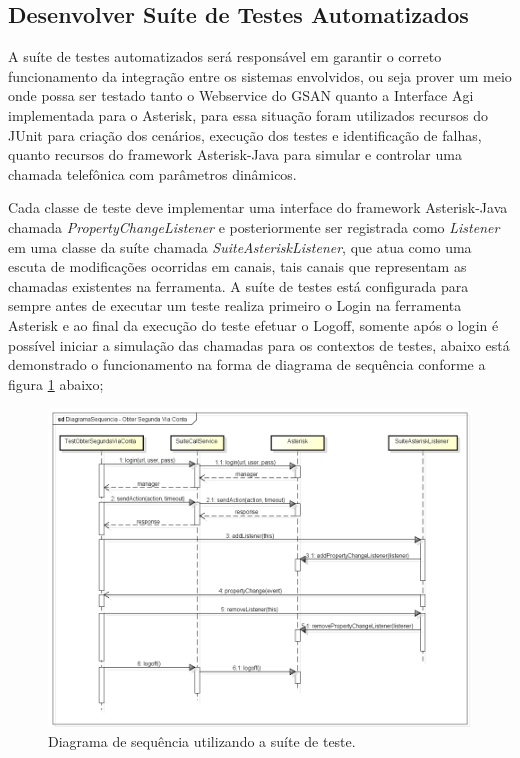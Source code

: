 \subsection{Desenvolver Suíte de Testes Automatizados}

A suíte de testes automatizados será responsável em garantir o correto funcionamento da integração entre os sistemas envolvidos, ou seja prover um meio onde possa ser testado tanto o Webservice do GSAN quanto a Interface Agi implementada para o Asterisk, para essa situação foram utilizados recursos do JUnit para criação dos cenários, execução dos testes e identificação de falhas, quanto recursos do framework Asterisk-Java para simular e controlar uma chamada telefônica com parâmetros dinâmicos.   

Cada classe de teste deve implementar uma interface do framework Asterisk-Java chamada \textit{PropertyChangeListener} e posteriormente ser registrada como \textit{Listener} em uma classe da suíte chamada \textit{SuiteAsteriskListener}, que atua como uma escuta de modificações ocorridas em  canais, tais canais que representam as chamadas existentes na ferramenta. 
A suíte de testes está configurada para sempre antes de executar um teste realiza primeiro o Login na ferramenta Asterisk e ao final da execução do teste efetuar o Logoff, somente após o login é possível iniciar a simulação das chamadas para os contextos de testes, abaixo está demonstrado o funcionamento na forma de diagrama de sequência conforme a figura \ref{figura:diagramaSeq2Via} abaixo;

\begin{figure}[!htb]
	\centering
	\caption{Diagrama de sequência utilizando a suíte de teste.}
	\label{figura:diagramaSeq2Via}
	\includegraphics{figuras/diagramaSequenciaObter2ViaTest.png}
\end{figure}

